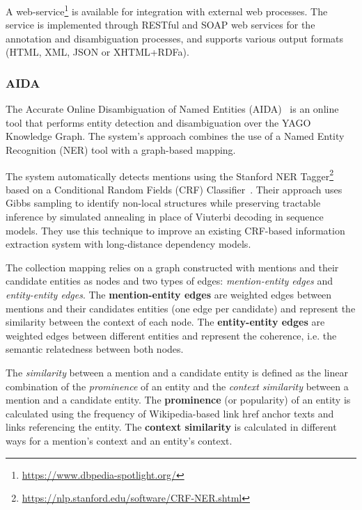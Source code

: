 A web-service\footnote{\url{https://www.dbpedia-spotlight.org/}} is available for integration with 
external web processes. The service is implemented through RESTful and SOAP web services for 
the annotation and disambiguation processes, and supports various output formats (HTML, XML, 
JSON or XHTML+RDFa).

\subsubsection{AIDA}
\label{cap3:infExtr/entityLinking/aida}
The Accurate Online Disambiguation of Named Entities (AIDA)~\cite{EL:aida-HoffartYBFPSTTW11,EL:aida-tool-YosefHBSW11} 
is an online tool that performs entity detection and disambiguation over the YAGO Knowledge 
Graph. The system's approach combines the use of a Named Entity Recognition (NER) tool with a 
graph-based mapping. 

The system automatically detects mentions using the Stanford NER 
Tagger\footnote{\url{https://nlp.stanford.edu/software/CRF-NER.shtml}} based on a Conditional Random 
Fields (CRF) Classifier~\cite{entLin:FinkelGM05}. Their approach uses Gibbs sampling to identify 
non-local structures while preserving tractable inference by simulated annealing in place of 
Viuterbi decoding in sequence models. They use this technique to improve an existing CRF-based 
information extraction system with long-distance dependency models.

The collection mapping relies on a graph constructed with mentions and their candidate entities 
as nodes and two types of edges: \textit{mention-entity edges} and \textit{entity-entity edges}. 
The \textbf{mention-entity edges} are weighted edges between mentions and their candidates 
entities (one edge per candidate) and represent the similarity between the context of each node. 
The \textbf{entity-entity edges} are weighted edges between different entities and represent the 
coherence, i.e. the semantic relatedness between both nodes.

The \textit{similarity} between a mention and a candidate entity is defined as the linear 
combination of the \textit{prominence} of an entity and the \textit{context similarity} between 
a mention and a candidate entity. The \textbf{prominence} (or popularity) of an entity is 
calculated using the frequency of Wikipedia-based link href anchor texts and links referencing 
the entity. The \textbf{context similarity} is calculated in different ways for a mention's 
context and an entity's context. 

